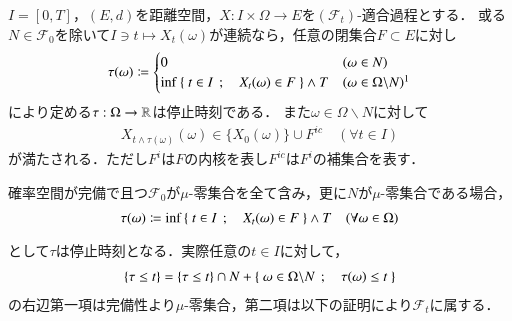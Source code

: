 	\begin{screen}
		\begin{thm}[閉集合と停止時刻]
			$I = [0,T]$，$(E,d)$を距離空間，$X:I \times \Omega \rightarrow E$を$(\mathcal{F}_t)$-適合過程とする．
			或る$N \in \mathcal{F}_0$を除いて$I \ni t \longmapsto X_t(\omega)$が連続なら，任意の閉集合$F \subset E$に対し
			\begin{align}
				\tau(\omega) \coloneqq
				\begin{cases}
					0 & (\omega \in N) \\
					\inf{}{\Set{t \in I}{X_t(\omega) \in F}} \wedge T & (\omega \in \Omega \backslash N) \footnotemark
				\end{cases}
			\end{align}
			により定める$\tau:\Omega \rightarrow \mathbb{R}$は停止時刻である．
			また$\omega \in \Omega \backslash N$に対して
			\begin{align}
				X_{t \wedge \tau(\omega)}(\omega) \in \{ X_0(\omega) \} \cup F^{ic} \quad (\forall t \in I)
			\end{align}
			が満たされる．ただし$F^i$は$F$の内核を表し$F^{ic}$は$F^i$の補集合を表す．
			\label{thm:closed_set_stopping_time}
		\end{thm}
	\end{screen}
	確率空間が完備で且つ$\mathcal{F}_0$が$\mu$-零集合を全て含み，更に$N$が$\mu$-零集合である場合，
	\begin{align}
		\tau(\omega) \coloneqq \operatorname*{inf}_{} \left\{\ t \in I\ \, ; \quad X_t(\omega) \in F\ \right\} \wedge T
		\quad (\forall \omega \in \Omega)
	\end{align}
	として$\tau$は停止時刻となる．実際任意の$t \in I$に対して，
	\begin{align}
		\{\tau \leq t\} = \{\tau \leq t\} \cap N + \left\{\ \omega \in \Omega \backslash N\ \, ; \quad \tau(\omega) \leq t\ \right\}
	\end{align}
	の右辺第一項は完備性より$\mu$-零集合，第二項は以下の証明により$\mathcal{F}_t$に属する．

